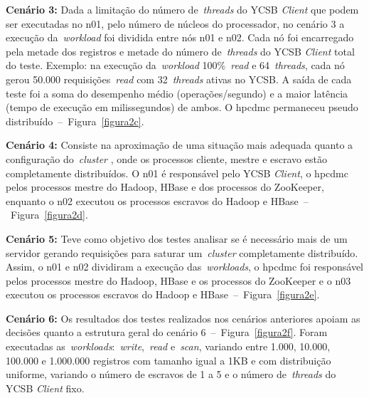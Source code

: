 \documentclass[12pt]{article}
\begin{document}
\textbf{Cenário 3:} Dada a limitação do número de~\emph{threads} do YCSB \emph{Client} que podem ser executadas no n01, pelo número de núcleos do processador, no cenário 3 a execução da~\emph{workload} foi dividida entre nós n01 e n02. Cada nó foi encarregado pela metade dos registros e metade do número de~\emph{threads} do YCSB \emph{Client} total do teste. Exemplo: na execução da~\emph{workload} 100\%~\emph{read} e 64~\emph{threads}, cada nó gerou 50.000 requisições~\emph{read} com 32~\emph{threads} ativas no YCSB. A saída de cada teste foi a soma do desempenho médio (operações/segundo) e a maior latência (tempo de execução em milissegundos) de ambos. O hpcdmc permaneceu pseudo distribuído~--~Figura~\ref{figura2c}.

\textbf{Cenário 4:} Consiste na aproximação de uma situação mais adequada quanto a configuração do~\emph{cluster} , onde os processos cliente, mestre e escravo estão completamente distribuídos. O n01 é responsável pelo YCSB \textit{Client}, o hpcdmc pelos processos mestre do Hadoop, HBase e dos processos do ZooKeeper, enquanto o n02 executou os processos escravos do Hadoop e HBase~--~Figura~\ref{figura2d}.

\textbf{Cenário 5:} Teve como objetivo dos testes analisar se é necessário mais de um servidor gerando requisições para saturar um~\emph{cluster} completamente distribuído. Assim, o n01 e n02 dividiram a execução das~\emph{workloads}, o hpcdmc foi responsável pelos processos mestre do Hadoop, HBase e os processos do ZooKeeper e o n03 executou os processos escravos do Hadoop e HBase~--~Figura~\ref{figura2e}.

\textbf{Cenário 6:} Os resultados dos testes realizados nos cenários anteriores apoiam as decisões quanto a estrutura geral do cenário 6~--~Figura~\ref{figura2f}. Foram executadas as~\emph{workloads}:~\emph{write},~\emph{read} e~\emph{scan}, variando entre 1.000, 10.000, 100.000 e 1.000.000 registros com tamanho igual a 1KB e com distribuição uniforme, variando o número de escravos de 1 a 5 e o número de~\emph{threads} do YCSB \textit{Client} fixo.
\end{document}
